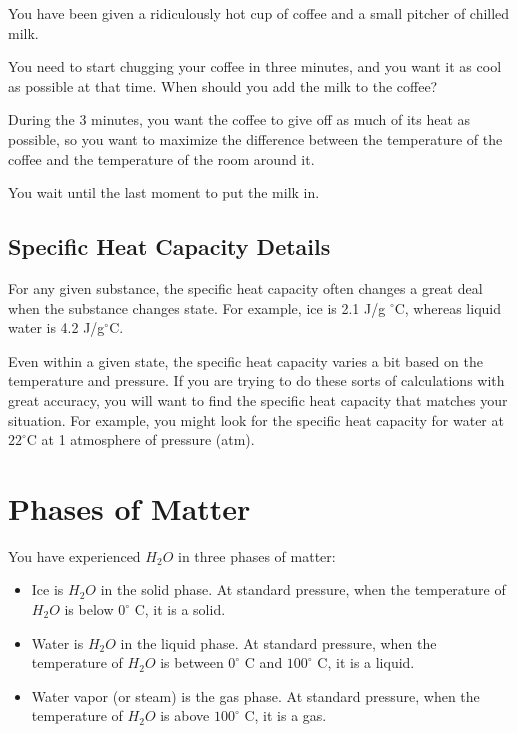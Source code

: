 \begin{Exercise}[title={Cooling Your Coffee}, label=cool_coffee]

  You have been given a ridiculously hot cup of coffee and a small pitcher of chilled milk.

  You need to start chugging your coffee in three minutes, and you want it as cool as possible at that time. When should you add the milk to the coffee?

\end{Exercise}
\begin{Answer}[ref=cool_coffee]

  During the 3 minutes, you want the coffee to give off as much of its
  heat as possible, so you want to maximize the difference between the
  temperature of the coffee and the temperature of the room around
  it.

  You wait until the last moment to put the milk in.

\end{Answer}

\subsection{Specific Heat Capacity Details}

For any given substance, the specific heat capacity often changes a
great deal when the substance changes state. For example, ice is 2.1 J/g
$^\circ$C, whereas liquid water is 4.2 J/g$^\circ$C.

Even within a given state, the specific heat capacity varies a bit
based on the temperature and pressure. If you are trying to do these
sorts of calculations with great accuracy, you will want to find the
specific heat capacity that matches your situation. For example, you
might look for the specific heat capacity for water at $22^\circ$C at
1 atmosphere of pressure (atm).


\section{Phases of Matter}
You have experienced $H_2O$ in three phases of matter:
\begin{itemize}
\item Ice is $H_2O$ in the solid phase. At standard pressure, when the temperature of $H_2O$ is below $0^\circ$ C, it is a solid. 
\item Water is $H_2O$ in the liquid phase. At standard pressure, when the temperature of $H_2O$ is between $0^\circ$ C and $100^\circ$ C, it is a liquid.
\item Water vapor (or steam) is the gas phase. At standard pressure, when the temperature of $H_2O$ is above $100^\circ$ C, it is a gas.
\end{itemize}

